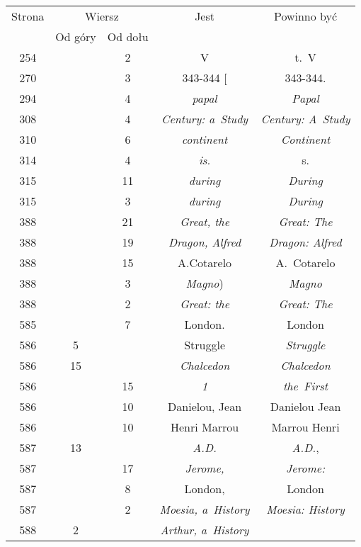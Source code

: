 \documentclass[a4paper,11pt]{article}
\begin{document}
\begin{center}
  \begin{tabular}{|c|c|c|c|c|}
    \hline
    Strona & \multicolumn{2}{c|}{Wiersz} & Jest
                              & Powinno być \\ \cline{2-3}
    & Od góry & Od dołu & & \\
    \hline
    254 & & \hphantom{0}2 & V & t.~V \\
    270 & & \hphantom{0}3 & 343-344 [ & 343-344. \\
    294 & & \hphantom{0}4 & \textit{papal} & \textit{Papal} \\
    308 & & \hphantom{0}4 & \textit{Century: a~Study}
    & \textit{Century: A~Study} \\
    310 & & \hphantom{0}6 & \textit{continent} & \textit{Continent} \\
    314 & & \hphantom{0}4 & \textit{is.} & s. \\
    315 & & 11 & \textit{during} & \textit{During} \\
    315 & & \hphantom{0}3 & \textit{during} & \textit{During} \\
    388 & & 21 & \textit{Great, the} & \textit{Great: The} \\
    388 & & 19 & \textit{Dragon, Alfred} & \textit{Dragon: Alfred} \\
    388 & & 15 & A.Cotarelo & A.~Cotarelo \\
    388 & & \hphantom{0}3 & \textit{Magno}) & \textit{Magno} \\
    388 & & \hphantom{0}2 & \textit{Great: the} & \textit{Great: The} \\
    585 & & \hphantom{0}7 & London. & London \\
    586 & \hphantom{0}5 & & Struggle & \textit{Struggle} \\
    586 & 15 & & \textit{Chalcedon} & \textit{Chalcedon} \\
    586 & & 15 & \textit{1} & \textit{the~First} \\
    586 & & 10 & Danielou, Jean & Danielou Jean \\
    586 & & 10 & Henri Marrou & Marrou Henri \\
    587 & 13 & & \textit{A.D.} & \textit{A.D.}, \\
    587 & & 17 & \textit{Jerome,} & \textit{Jerome:} \\
    587 & & \hphantom{0}8 & London, & London \\
    587 & & \hphantom{0}2 & \textit{Moesia, a~History}
    & \textit{Moesia: History} \\
    588 & \hphantom{0}2 & & \textit{Arthur, a~History}

\end{tabular}
\end{center}
\end{document}
